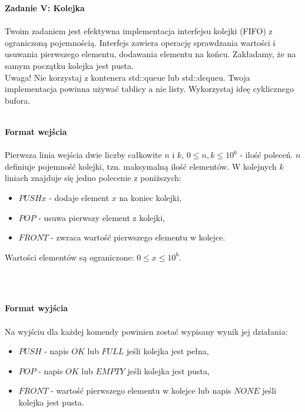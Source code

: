 \documentclass[
  fontsize=12pt  %
 ,english        %
 ,headinclude    %
 ,headsepline    %
]{scrbook}       %
\begin{document}
\vspace{50 mm}
\hspace{50 mm}
\newline

\par{\Large \textbf{Zadanie V: Kolejka}} \\ \\
Twoim zadaniem jest efektywna implementacja interfejsu kolejki (FIFO) z ograniczoną pojemnością. Interfejs zawiera operację sprawdzania wartości i usuwania pierwszego elementu, dodawania elementu na końcu. Zakładamy, że na samym początku kolejka jest pusta.
\\
Uwaga! Nie korzystaj z kontenera std::queue lub std::dequeu. Twoja implementacja powinna używać tablicy a nie listy. Wykorzystaj ideę cyklicznego bufora.
\\ \\
\par{\Large \textbf{Format wejścia}} \\ \\
Pierwsza linia wejścia dwie liczby całkowite $n$ i $k$, $0 \leq n, k \leq 10^6$ - ilość poleceń. $n$ definiuje pojemność kolejki, tzn. maksymalną ilość elementów. W kolejnych $k$ liniach znajduje się jedno polecenie z poniższych:
\begin{itemize}
  \item $PUSH x$ - dodaje element $x$ na koniec kolejki,
  \item $POP$ - usuwa pierwszy element z kolejki,
  \item $FRONT$ - zwraca wartość pierwszego elementu w kolejce.
\end{itemize}

Wartości elementów są ograniczone: $0 \leq x \leq 10^6$.

\\ \\
\par{\Large \textbf{Format wyjścia}} \\ \\
Na wyjściu dla każdej komendy powinien zostać wypisany wynik jej działania:
\begin{itemize}
  \item $PUSH$ - napis $OK$ lub $FULL$ jeśli kolejka jest pełna,
  \item $POP$ - napis $OK$ lub $EMPTY$ jeśli kolejka jest pusta,
  \item $FRONT$ - wartość pierwszego elementu w kolejce lub napis $NONE$ jeśli kolejka jest pusta.
\end{itemize}
\end{document}
